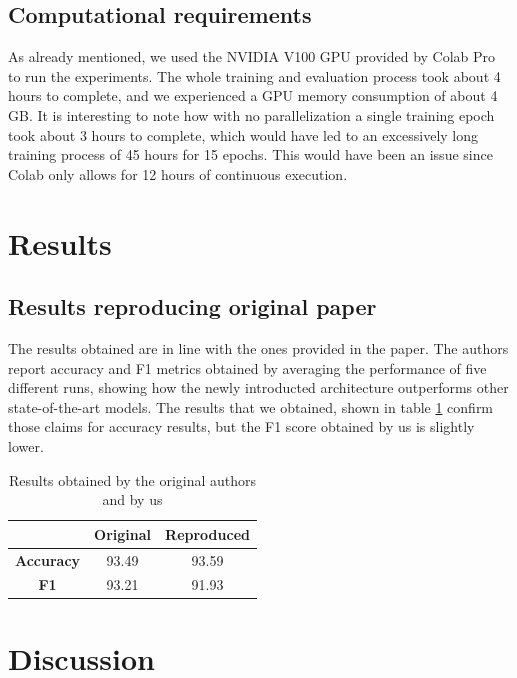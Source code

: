 \subsection{Computational requirements}
As already mentioned, we used the NVIDIA V100 GPU provided by Colab Pro to run the experiments. The whole training and evaluation process took about 4 hours to complete, and we experienced a GPU memory consumption of about 4 GB. It is interesting to note how with no parallelization a single training epoch took about 3 hours to complete, which would have led to an excessively long training process of 45 hours for 15 epochs. This would have been an issue since Colab only allows for 12 hours of continuous execution.

\section{Results}
\label{sec:results}

\subsection{Results reproducing original paper}
The results obtained are in line with the ones provided in the paper. The authors report accuracy and F1 metrics obtained by averaging the performance of five different runs, showing how the newly introducted architecture outperforms other state-of-the-art models. The results that we obtained, shown in table \ref{tab:results} confirm those claims for accuracy results, but the F1 score obtained by us is slightly lower. 

\begin{table}
    \caption{Results obtained by the original authors and by us}
    \label{tab:results}
    \centering
    \begin{tabular}{| c|c c|}
        \hline
         & \textbf{Original} & \textbf{Reproduced} \\
        \hline
         \textbf{Accuracy} & 93.49 & 93.59 \\
        \hline
        \textbf{F1} & 93.21 & 91.93 \\
        \hline
    \end{tabular}
\end{table}

\section{Discussion}

